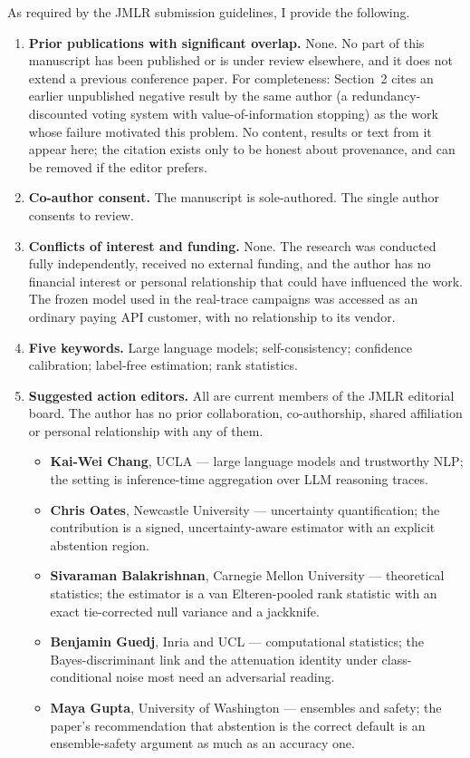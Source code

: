 \documentclass[11pt]{article}
\begin{document}
As required by the JMLR submission guidelines, I provide the following.

\begin{enumerate}[leftmargin=*]

\item \textbf{Prior publications with significant overlap.} None. No part of
this manuscript has been published or is under review elsewhere, and it does
not extend a previous conference paper. For completeness: Section~2 cites an
earlier unpublished negative result by the same author (a
redundancy-discounted voting system with value-of-information stopping) as the
work whose failure motivated this problem. No content, results or text from it
appear here; the citation exists only to be honest about provenance, and can
be removed if the editor prefers.

\item \textbf{Co-author consent.} The manuscript is sole-authored. The single
author consents to review.

\item \textbf{Conflicts of interest and funding.} None. The research was
conducted fully independently, received no external funding, and the author has
no financial interest or personal relationship that could have influenced the
work. The frozen model used in the real-trace campaigns was accessed as an
ordinary paying API customer, with no relationship to its vendor.

\item \textbf{Five keywords.} Large language models; self-consistency;
confidence calibration; label-free estimation; rank statistics.

\item \textbf{Suggested action editors.} All are current members of the JMLR
editorial board. The author has no prior collaboration, co-authorship, shared
affiliation or personal relationship with any of them.
\begin{itemize}[leftmargin=1.2em]
  \item \textbf{Kai-Wei Chang}, UCLA --- large language models and trustworthy
        NLP; the setting is inference-time aggregation over LLM reasoning
        traces.
  \item \textbf{Chris Oates}, Newcastle University --- uncertainty
        quantification; the contribution is a signed, uncertainty-aware
        estimator with an explicit abstention region.
  \item \textbf{Sivaraman Balakrishnan}, Carnegie Mellon University ---
        theoretical statistics; the estimator is a van Elteren-pooled rank
        statistic with an exact tie-corrected null variance and a jackknife.
  \item \textbf{Benjamin Guedj}, Inria and UCL --- computational statistics;
        the Bayes-discriminant link and the attenuation identity under
        class-conditional noise most need an adversarial reading.
  \item \textbf{Maya Gupta}, University of Washington --- ensembles and
        safety; the paper's recommendation that abstention is the correct
        default is an ensemble-safety argument as much as an accuracy one.
\end{itemize}


\end{enumerate}
\end{document}
